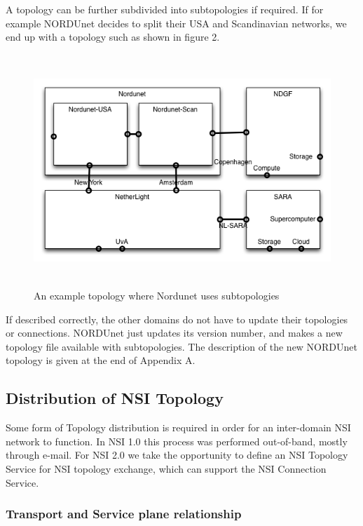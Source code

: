 \documentclass{article}
\begin{document}
 A topology can be further subdivided into subtopologies if required. 
If for example NORDUnet decides to split their USA and Scandinavian networks, we 
end up with a topology such as shown in figure 2.

\begin{figure}[htbp]
\begin{center}
\includegraphics[width=403pt, height=248pt]{NSITopologyService-fig002.png}
\caption{An example topology where Nordunet uses subtopologies}
\end{center}
\end{figure}


 If described correctly, the other domains do not have to update 
their topologies or connections. NORDUnet just updates its version number, and 
makes a new topology file available with subtopologies. The description of the 
new NORDUnet topology is given at the end of Appendix A.\label{h.ikfi9yd4mu6x}


\subsection{Distribution of NSI Topology}

 Some form of Topology distribution is required in order for an 
inter-domain NSI network to function. In NSI 1.0 this process was performed out-of-band, 
mostly through e-mail. For NSI 2.0 we take the opportunity to define an NSI Topology 
Service for NSI topology exchange, which can support the NSI Connection Service.\label{h.c2129mkn366h}


\subsubsection{Transport and Service plane relationship}
\end{document}
